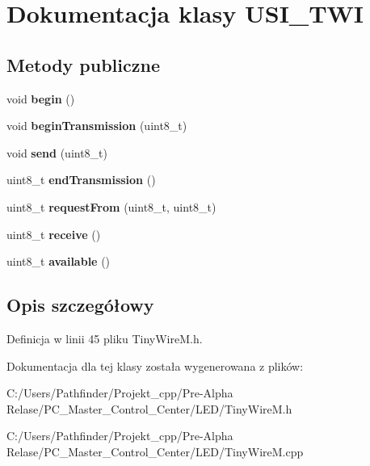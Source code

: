 \hypertarget{class_u_s_i___t_w_i}{}\section{Dokumentacja klasy U\+S\+I\+\_\+\+T\+WI}
\label{class_u_s_i___t_w_i}
\subsection*{Metody publiczne}
\begin{DoxyCompactItemize}
\item 
\mbox{\label{class_u_s_i___t_w_i_aa0fbe4310bcb851594111d1b5836dde1}} 
void {\bfseries begin} ()
\item 
\mbox{\label{class_u_s_i___t_w_i_a3a878417eecd6a7c76491e123f2ed9a6}} 
void {\bfseries begin\+Transmission} (uint8\+\_\+t)
\item 
\mbox{\label{class_u_s_i___t_w_i_a16781fb06a6ef8becee1b00cc8b17607}} 
void {\bfseries send} (uint8\+\_\+t)
\item 
\mbox{\label{class_u_s_i___t_w_i_a305bf41e222299639d5f76e3a55daddc}} 
uint8\+\_\+t {\bfseries end\+Transmission} ()
\item 
\mbox{\label{class_u_s_i___t_w_i_afaa03a44e099834c1eb4656790c2cdb0}} 
uint8\+\_\+t {\bfseries request\+From} (uint8\+\_\+t, uint8\+\_\+t)
\item 
\mbox{\label{class_u_s_i___t_w_i_a0827de3a2eac21d837d001bbf3d11c67}} 
uint8\+\_\+t {\bfseries receive} ()
\item 
\mbox{\label{class_u_s_i___t_w_i_af0dea84f76b1c50a5074b1daca89cad1}} 
uint8\+\_\+t {\bfseries available} ()
\end{DoxyCompactItemize}


\subsection{Opis szczegółowy}


Definicja w linii 45 pliku Tiny\+Wire\+M.\+h.



Dokumentacja dla tej klasy została wygenerowana z plików\+:\begin{DoxyCompactItemize}
\item 
C\+:/\+Users/\+Pathfinder/\+Projekt\+\_\+cpp/\+Pre-\/\+Alpha Relase/\+P\+C\+\_\+\+Master\+\_\+\+Control\+\_\+\+Center/\+L\+E\+D/Tiny\+Wire\+M.\+h\item 
C\+:/\+Users/\+Pathfinder/\+Projekt\+\_\+cpp/\+Pre-\/\+Alpha Relase/\+P\+C\+\_\+\+Master\+\_\+\+Control\+\_\+\+Center/\+L\+E\+D/Tiny\+Wire\+M.\+cpp\end{DoxyCompactItemize}
